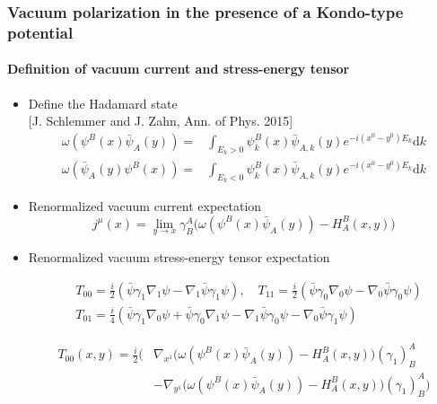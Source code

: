 \documentclass[english]{beamer}
\newcommand{\dd}[0]{\textrm{d}}
\begin{document}
\begin{frame}[shrink=30]
\frametitle{\small{Vacuum polarization in the presence of a Kondo-type potential}}
\framesubtitle{Definition of vacuum current and stress-energy tensor}

\begin{itemize}
\item<1-> Define the Hadamard state
\\\tiny\color{blue}[J. Schlemmer and J. Zahn, Ann. of Phys. 2015]\color{black}\normalsize
\begin{equation*}
\begin{split}
\omega(\psi^B(x)\bar{\psi}_A(y)) = & \int_{E_k >0} \psi_k^B(x)\bar{\psi}_{A,k}(y)e^{-i(x^0-y^0)E_k} \dd k \\
\omega(\bar{\psi}_A(y)\psi^B(x)) = & \int_{E_k <0} \psi_k^B(x)\bar{\psi}_{A,k}(y)e^{-i(x^0-y^0)E_k} \dd k 
\end{split}
\end{equation*}
%
\item<2-> Renormalized vacuum current expectation
\begin{equation*}
j^\mu(x) = \lim_{y \rightarrow x} \gamma^A_B \big(
\omega(\psi^B(x)\bar{\psi}_A(y)) - H^B_A (x, y)\big)
\end{equation*}

%
\item<3-> Renormalized vacuum stress-energy tensor expectation

\begin{equation*}
\begin{split}
& T_{00} = \frac{i}{2} (\bar{\psi} \gamma_1 \nabla_1 \psi - \nabla_1 \bar{\psi}\gamma_1 \psi) , \quad
 T_{11} = \frac{i}{2} (\bar{\psi} \gamma_0 \nabla_0 \psi - \nabla_0 \bar{\psi}\gamma_0 \psi)  \\
& T_{01} = \frac{i}{4} (\bar{\psi} \gamma_1 \nabla_0 \psi +\bar{\psi} \gamma_0 \nabla_1 \psi - \nabla_1 \bar{\psi}\gamma_0 \psi - \nabla_0 \bar{\psi}\gamma_1 \psi)  
\end{split}
\end{equation*}

\begin{equation*}
\begin{split}
T_{00}(x,y) = 
\frac{i}{2}\Big( & 
\nabla_{x^1}\big(\omega(  \psi^B(x) \bar{\psi}_A(y))-H^B_A(x,y)\big)(\gamma_1)^A_B \\
& - \nabla_{y^1}\Big(\omega( \psi^B(x)  \bar{\psi}_A(y)) - H^B_A(x,y)\big)(\gamma_1)^A_B \Big)   
\end{split}
\end{equation*}

\end{itemize}
\end{frame}
\end{document}
